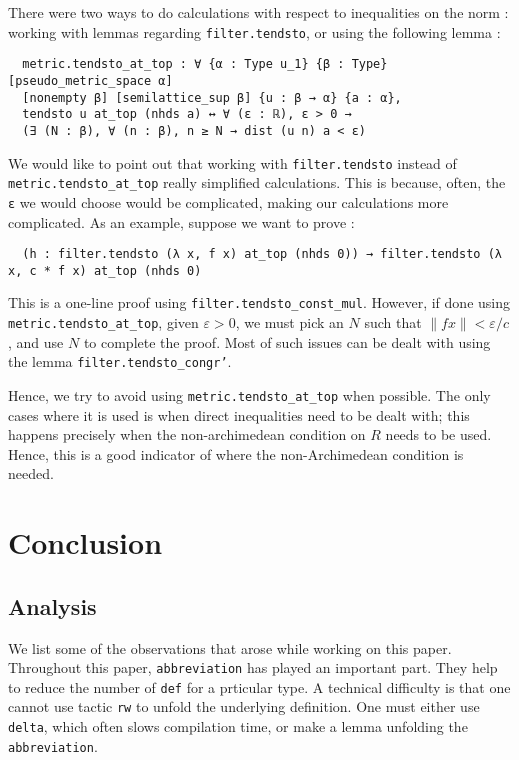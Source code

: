 \documentclass[a4paper,UKenglish,cleveref, autoref, thm-restate]{lipics-v2021}
\newcommand{\lean}[1]{\texttt{#1}\xspace} %
\begin{document}
There were two ways to do calculations with respect to inequalities on the norm : working with lemmas regarding \lean{filter.tendsto}, 
or using the following lemma : 
\begin{lstlisting}
  metric.tendsto_at_top : ∀ {α : Type u_1} {β : Type} [pseudo_metric_space α] 
  [nonempty β] [semilattice_sup β] {u : β → α} {a : α}, 
  tendsto u at_top (nhds a) ↔ ∀ (ε : ℝ), ε > 0 → 
  (∃ (N : β), ∀ (n : β), n ≥ N → dist (u n) a < ε)
\end{lstlisting}
We would like to point out that working with \lean{filter.tendsto} instead of \lean{metric.tendsto\_at\_top} really simplified 
calculations. This is because, often, the \lean{ε} we would choose would be complicated, making our calculations more 
complicated. As an example, suppose we want to prove :
\begin{lstlisting}
  (h : filter.tendsto (λ x, f x) at_top (nhds 0)) → filter.tendsto (λ x, c * f x) at_top (nhds 0)
\end{lstlisting}
This is a one-line proof using \lean{filter.tendsto\_const\_mul}. However, if done using \lean{metric.tendsto\_at\_top}, 
given $\varepsilon > 0$, we must pick an $N$ such that $\lVert f x \rVert < \varepsilon / c$, and use $N$ to complete the proof. 
Most of such issues can be dealt with using the lemma \lean{filter.tendsto\_congr'}. 

Hence, we try to avoid using \lean{metric.tendsto\_at\_top} when possible. The only cases where it is used is when direct inequalities 
need to be dealt with; this happens precisely when the non-archimedean condition on $R$ needs to be used. Hence, this is a good 
indicator of where the non-Archimedean condition is needed.

\section{Conclusion}
\label{section5}
\subsection{Analysis}
We list some of the observations that arose while working on this paper. 
Throughout this paper, \lean{abbreviation} has played an important part. They help to reduce the number of \lean{def} for a prticular type. A technical 
difficulty is that one cannot use tactic \lean{rw} to unfold the underlying definition. One must either use \lean{delta}, which often slows compilation 
time, or make a lemma unfolding the \lean{abbreviation}.  
\end{document}
